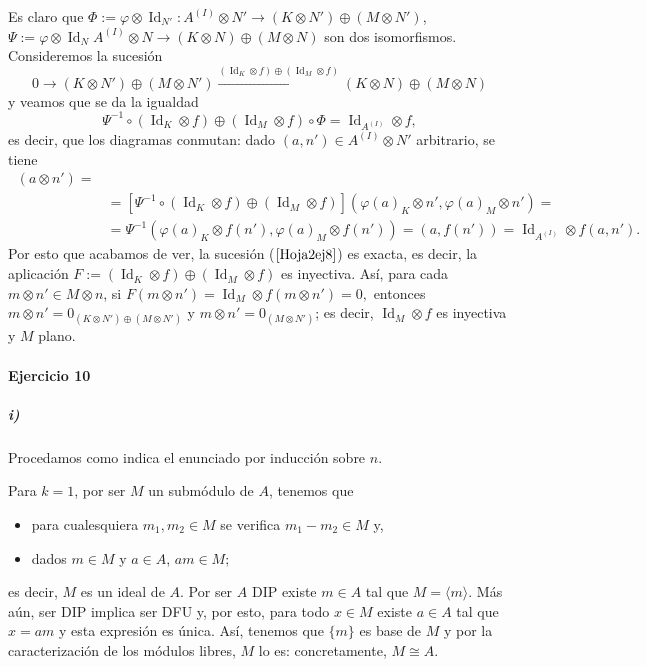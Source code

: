 \documentclass[../main.tex]{subfiles}
\begin{document}
Es claro que $\Phi:=\varphi\otimes \operatorname{Id}_{N'}: A^{(I)}\otimes N'\longrightarrow (K\otimes N')\oplus(M\otimes N')$, $\Psi:=\varphi\otimes \operatorname{Id}_{N}A^{(I)}\otimes N\longrightarrow (K\otimes N)\oplus(M\otimes N)$ son dos isomorfismos. Consideremos la sucesión
\begin{equation}\label{Hoja2ej8}
    0\longrightarrow (K\otimes N')\oplus(M\otimes N')\overset{(\operatorname{Id}_{K}\otimes f)\oplus (\operatorname{Id}_{M}\otimes f)}{\longrightarrow} (K\otimes N)\oplus(M\otimes N)
\end{equation}
y veamos que se da la igualdad
$$\Psi^{-1}\circ(\operatorname{Id}_{K}\otimes f)\oplus (\operatorname{Id}_{M}\otimes f)\circ\Phi=\operatorname{Id}_{A^{(I)}}\otimes f,$$
es decir, que los diagramas conmutan: dado $(a,n')\in A^{(I)}\otimes N'$ arbitrario, se tiene
\begin{align*}
    [\Psi^{-1}\circ&(\operatorname{Id}_{K}\otimes f)\oplus (\operatorname{Id}_{M}\otimes f)\circ\Phi]\ (a\otimes n')=\\
    &=[\Psi^{-1}\circ(\operatorname{Id}_{K}\otimes f)\oplus (\operatorname{Id}_{M}\otimes f)](\varphi(a)_K\otimes n',\varphi(a)_M\otimes n')=\\
    &=\Psi^{-1}(\varphi(a)_K\otimes f(n'),\varphi(a)_M\otimes f(n'))=(a,f(n'))=\operatorname{Id}_{A^{(I)}}\otimes f(a,n').
\end{align*}
Por esto que acabamos de ver, la sucesión ($\ref{Hoja2ej8}$) es exacta, es decir, la aplicación $F:=(\operatorname{Id}_{K}\otimes f)\oplus (\operatorname{Id}_{M}\otimes f)$ es inyectiva. 
Así, para cada $m\otimes n'\in M\otimes n$, si $F(m\otimes n')=\operatorname{Id}_{M}\otimes f(m\otimes n')=0,$ entonces $m\otimes n'=0_{(K\otimes N')\oplus(M\otimes N')}$ y $m\otimes n'=0_{(M\otimes N')}$; es decir, $\operatorname{Id}_{M}\otimes f$ es inyectiva y $M$ plano.

\paragraph{Ejercicio 10}
\subparagraph{i)} Procedamos como indica el enunciado por inducción sobre $n$.

Para $k=1$, por ser $M$ un submódulo de $A$, tenemos que
\begin{itemize}
    \item para cualesquiera $m_1,m_2\in M$ se verifica $m_1-m_2\in M$ y,
    \item dados $m\in M$ y $a\in A$, $am\in M;$
\end{itemize}
es decir, $M$ es un ideal de $A$. Por ser $A$ DIP existe $m\in A$ tal que $M=\langle m\rangle$. Más aún, ser DIP implica ser DFU y, por esto, para todo $x\in M$ existe $a\in A$ tal que $x=am$ y esta expresión es única. Así, tenemos que $\{m\}$ es base de $M$ y por la caracterización de los módulos libres, $M$ lo es: concretamente, $M\cong A$.
\end{document}
